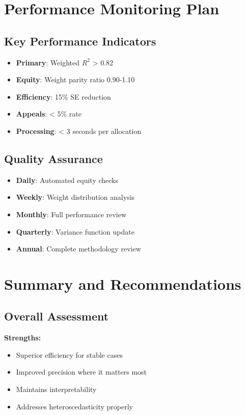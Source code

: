 \section{Performance Monitoring Plan}

\subsection{Key Performance Indicators}

\begin{itemize}
    \item \textbf{Primary}: Weighted $R^2$ > 0.82
    \item \textbf{Equity}: Weight parity ratio 0.90-1.10
    \item \textbf{Efficiency}: 15\% SE reduction
    \item \textbf{Appeals}: < 5\% rate
    \item \textbf{Processing}: < 3 seconds per allocation
\end{itemize}

\subsection{Quality Assurance}

\begin{itemize}
    \item \textbf{Daily}: Automated equity checks
    \item \textbf{Weekly}: Weight distribution analysis
    \item \textbf{Monthly}: Full performance review
    \item \textbf{Quarterly}: Variance function update
    \item \textbf{Annual}: Complete methodology review
\end{itemize}

\section{Summary and Recommendations}

\subsection{Overall Assessment}

\textbf{Strengths:}
\begin{itemize}
    \item Superior efficiency for stable cases
    \item Improved precision where it matters most
    \item Maintains interpretability
    \item Addresses heteroscedasticity properly
\end{itemize}

